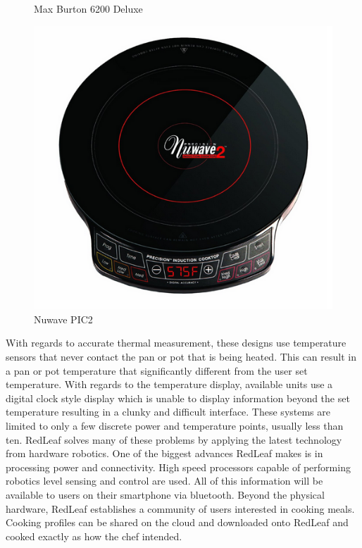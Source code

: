 \documentclass[11pt]{article}
\theoremstyle{definition}
\begin{document}
\begin{center}
\begin{figure}
\begin{minipage}[t]{4cm}
\caption{Max Burton 6200 Deluxe}
\label{fig:burton}
\end{minipage}
\hfill
\begin{minipage}[t]{4cm}
\includegraphics[width=1.1\textwidth]{nuwave.png}
\caption{Nuwave PIC2}
\label{fig:nuwave}
\end{minipage}
\hfill
\end{figure}
\end{center}


With regards to accurate thermal measurement, these designs use temperature sensors that never contact the pan or pot that is being heated. This can result in a pan or pot temperature that significantly different from the user set temperature. With regards to the temperature display, available units use a digital clock style display which is unable to display information beyond the set temperature resulting in a clunky and difficult interface. These systems are limited to only a few discrete power and temperature points, usually less than ten. 
RedLeaf solves many of these problems by applying the latest technology from hardware robotics. One of the biggest advances RedLeaf makes is in processing power and connectivity. High speed processors capable of performing robotics level sensing and control are used. All of this information will be available to users on their smartphone via bluetooth. Beyond the physical hardware, RedLeaf establishes a community of users interested in cooking meals. Cooking profiles can be shared on the cloud and downloaded onto RedLeaf and cooked exactly as how the chef intended. 
\end{document}
